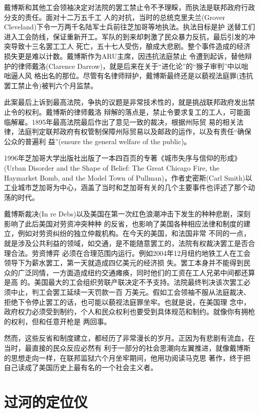\documentclass[10pt]{article}
\begin{document}
{戴博斯和其他工会领袖决定对法院的罢工禁止令不予理睬，而执法是联邦政府行政分支的责任。面对十二万五千工
人的对抗，当时的总统克里夫兰(Grover Cleveland)下令一万两千名陆军士兵前往芝加哥等地执法。执法目标是护
送替工们进入工会防线，保证重新开工。军队的到来却刺激了民众暴力反抗，最后引发的冲突导致十三名罢工工人
死亡，五十七人受伤，酿成大悲剧。整个事件造成的经济损失更是难以计数。戴博斯作为ARU主席，因违抗法庭禁止
令遭到起诉，替他辩护的律师戴洛(Clarence Darrow)，就是后来在关于``进化论''的``猴子审判''中以咄咄逼人风
格出名的那位。尽管有名律师辩护，戴博斯最终还是以藐视法庭罪(违抗罢工禁止令)被判六个月监禁。

此案最后上诉到最高法院，争执的议题是非常技术性的，就是挑战联邦政府发出禁止令的权利。戴博斯的律师戴洛
辩解的落点是，禁止令要求复工的工人，可能面临解雇。1895年最高法院最后作出了意见一致的裁决，根据州际贸
易的相关法律，法庭判定联邦政府有权管制保障州际贸易以及邮政的运作，以及有责任``确保公众的普遍利
益''(ensure the general welfare of the public)。

1996年芝加哥大学出版社出版了一本四百页的专著《城市失序与信仰的形成》(Urban Disorder and the Shape of
Belief: The Great Chicago Fire, the Haymarket Bomb, and the Model Town of Pullman)，作者史密斯(Carl
Smith)以工业城市芝加哥为中心，涵盖了当时和芝加哥有关的几个主要事件也评述了那个动荡的时代。

戴博斯裁决(In re Debs)以及美国在第一次红色浪潮冲击下发生的种种悲剧，深刻影响了此后美国对劳资冲突种种
的反省，也影响了美国各种相应法律和制度的建立，例如对劳资纠纷的独立仲裁机构。在今天的美国，和法国非常
不同的一点，就是涉及公共利益的领域，如交通，是不能随意罢工的，法院有权裁决罢工是否合理合法。劳资博弈
必须在合理范围内运行。例如2004年12月纽约地铁工人在工会领导下为薪水罢工，第一天就造成四亿美元的经济损
失。罢工本身并不能得到民众的广泛同情，一方面造成纽约交通瘫痪，同时他们的工资在工人兄弟中间都还算是高
的。美国最大的工会组织劳联产联决定不予支持。法院最终判决该次罢工必须中止，判工会罢工延续一天罚款一百
万美元。假如工会领袖不服从法庭裁决、拒绝下令停止罢工的话，也可能以藐视法庭罪坐牢。也就是说，在美国理
念中，政府权力必须受到制约，个人和民众权利也要受到具体规范和制约。就像你有拥枪的权利，但和任意开枪是
两回事。

然而，这些反省和制度建立，都经历了非常漫长的岁月。正因为有悲剧有流血，在当时，最直接的民众反应必然有
利于一部分的社会思潮向左翼推进，就像戴博斯的思想走向一样，在联邦监狱六个月坐牢期间，他用功阅读马克思
著作，终于把自己读成了美国历史上最有名的一个社会主义者。

\pagebreak
\section{过河的定位仪}

}
\end{document}
